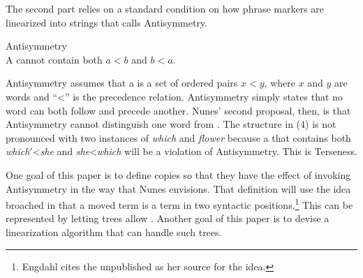 \documentclass[output=paper]{langsci/langscibook}
\begin{document}

The second part relies on a standard condition on how phrase markers are
linearized into strings that \cite{Kayne1994} calls Antisymmetry.

\begin{exe}
	\ex \label{ex:antisymm} Antisymmetry\\
	A  cannot contain both $a<b$ and $b<a$.
\end{exe}

Antisymmetry assumes that a  is a set of ordered pairs $x<y$,
where $x$ and $y$ are words and ``<'' is the precedence relation. Antisymmetry
simply states that no word can both follow and precede another. Nunes' second
proposal, then, is that Antisymmetry cannot distinguish one word from .
The structure in (4) is not pronounced with two instances of \emph{which} and
\emph{flower} because a  that contains both
\emph{which$'$}<\emph{she} and \emph{she}<\emph{which} will be a violation of
Antisymmetry. This is Terseness.

One goal of this paper is to define copies so that they have the effect of
invoking Antisymmetry in the way that Nunes envisions. That definition will use
the idea broached in \cite{Engdahl1980} that a moved term is a term in two
syntactic positions.\footnote{Engdahl cites the unpublished \citet{PetRit1981}
as her source for the idea.} This can be represented by letting 
trees allow . Another goal of this paper is to devise a
linearization algorithm that can handle such trees.
\end{document}
